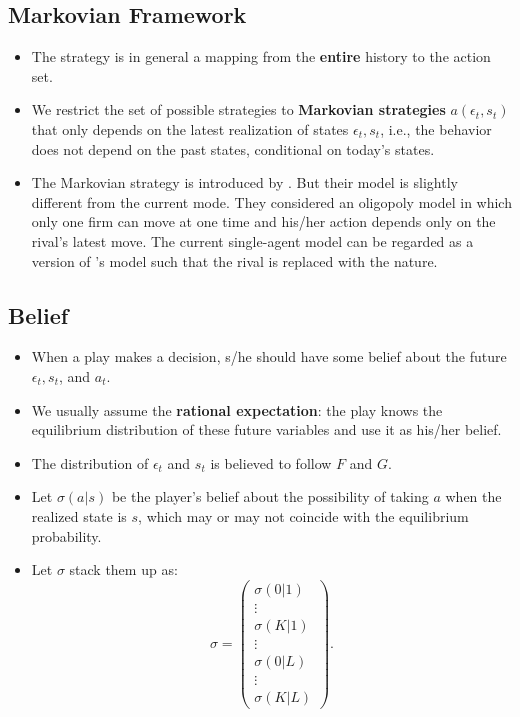 \documentclass[
]{book}
\providecommand{\tightlist}{%
  \setlength{\itemsep}{0pt}\setlength{\parskip}{0pt}}
\begin{document}
\hypertarget{markovian-framework}{%
\subsection{Markovian Framework}\label{markovian-framework}}

\begin{itemize}
\tightlist
\item
  The strategy is in general a mapping from the \textbf{entire} history to the action set.
\item
  We restrict the set of possible strategies to \textbf{Markovian strategies} \(a(\epsilon_t, s_t)\) that only depends on the latest realization of states \(\epsilon_t, s_t\), i.e., the behavior does not depend on the past states, conditional on today's states.
\item
  The Markovian strategy is introduced by \citet{maskinTheoryDynamicOligopoly1988}. But their model is slightly different from the current mode. They considered an oligopoly model in which only one firm can move at one time and his/her action depends only on the rival's latest move. The current single-agent model can be regarded as a version of \citet{maskinTheoryDynamicOligopoly1988}'s model such that the rival is replaced with the nature.
\end{itemize}

\hypertarget{belief}{%
\subsection{Belief}\label{belief}}

\begin{itemize}
\tightlist
\item
  When a play makes a decision, s/he should have some belief about the future \(\epsilon_t, s_t\), and \(a_t\).
\item
  We usually assume the \textbf{rational expectation}: the play knows the equilibrium distribution of these future variables and use it as his/her belief.
\item
  The distribution of \(\epsilon_t\) and \(s_t\) is believed to follow \(F\) and \(G\).
\item
  Let \(\sigma(a|s)\) be the player's belief about the possibility of taking \(a\) when the realized state is \(s\), which may or may not coincide with the equilibrium probability.
\item
  Let \(\sigma\) stack them up as:
  \begin{equation}
  \sigma = 
  \begin{pmatrix}
  \sigma(0|1)\\
  \vdots\\
  \sigma(K|1)\\
  \vdots\\ 
  \sigma(0|L)\\
  \vdots\\ 
  \sigma(K|L)
  \end{pmatrix}.
  \end{equation}
\end{itemize}
\end{document}
